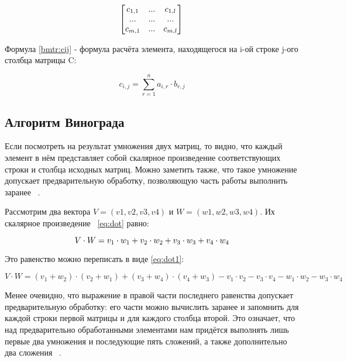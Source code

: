 \begin{equation}
 \label{bmtr:matrixc}
\begin{bmatrix}
c_{1,1} & ... & c_{1,l} \\
... & ... & ... \\
c_{m,1} & ... & c_{m,l} \\
\end{bmatrix} \\
\end{equation}

Формула \ref{bmtr:cij} - формула расчёта элемента, находящегося на i-ой строке j-ого столбца матрицы C:

\begin{equation}
 \label{bmtr:cij}
c_{i,j} = \sum\limits_{r=1}^n a_{i,r}\cdot b_{r,j}
\end{equation}

\subsection{Алгоритм Винограда}
Если посмотреть на результат умножения двух матриц, то видно, что каждый элемент в нём представляет собой скалярное произведение соответствующих строки и столбца исходных матриц. Можно заметить также, что такое умножение допускает предварительную обработку, позволяющую часть работы выполнить заранее ~\cite{vinogr}.
 
Рассмотрим два вектора $V = (v1, v2, v3, v4)$ и $W = (w1, w2, w3, w4)$. Их скалярное произведение ~\ref{eq:dot} равно: 

\begin{equation}
 \label{eq:dot}
 V \cdot W=v_1 \cdot w_1 + v_2 \cdot w_2 + v_3 \cdot w_3 + v_4 \cdot w_4\\
\end{equation}


Это равенство можно переписать в виде \ref{eq:dot1}:

\begin{equation}
 \label{eq:dot1}
V \cdot W=(v_1 + w_2) \cdot (v_2 + w_1) + (v_3 + w_4) \cdot (v_4 + w_3) - v_1 \cdot v_2 - 
v_3 \cdot v_4 - w_1 \cdot w_2 - w_3 \cdot w_4
\end{equation}

Менее очевидно, что выражение в правой части последнего равенства допускает предварительную обработку: его части можно вычислить заранее и запомнить для каждой строки первой матрицы и для каждого столбца второй. 
Это означает, что над предварительно обработанными элементами нам придётся выполнять лишь первые два умножения и последующие пять сложений, а также дополнительно два сложения ~\cite{vinogr}. 

